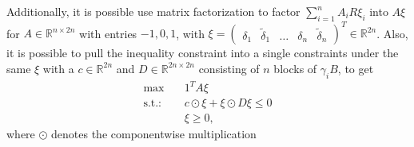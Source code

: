 Additionally, it is possible use matrix factorization to factor $\sum_{i=1}^{n}A_iR\xi_i$
into $A\xi$ for $A \in \mathbb{R}^{n\times2n}$ with entries $-1, 0,
1$, with $\xi = \begin{pmatrix} \delta_1 & \tilde{\delta}_1 & \hdots &
\delta_n & \tilde{\delta}_n \end{pmatrix}^{T}  \in \mathbb{R}^{2n}  $. Also,
it is possible to pull the inequality constraint into a single constraints
under the same $\xi$ with a $c \in \mathbb{R}^{2n}$ and $D \in \mathbb{R}^{2n
\times 2n}$ consisting of $n$ blocks of $\gamma_iB$, to get
\begin{align}
    \text{max} \quad & 1^{T}A\xi \label{eq: quadratically_constrained_general}\\
    \text{s.t.:}\quad & c\odot \xi + \xi \odot D\xi \le 0\\
          & \xi \ge 0,
\end{align}
where $\odot$ denotes the componentwise multiplication
